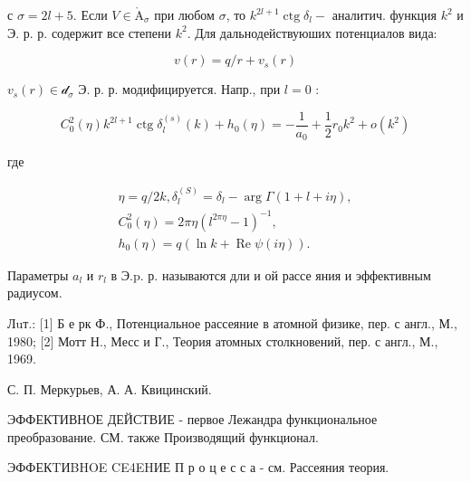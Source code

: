 \documentclass[10pt]{article}
\def\AA{\mathring{\mathrm{A}}}
\begin{document}
с $\sigma=2 l+5$. Если $V \in \AA_{\sigma}$ при любом $\sigma$, то $k^{2 l+1} \operatorname{ctg} \delta_{l}-$ аналитич. функция $k^{2}$ и Э. р. р. содержит все степени $k^{2}$. Для дальнодействуюших потенциалов вида:



\[

v(r)=q / r+v_{s}(r)

\]



$v_{s}(r) \in \mathscr{d}_{\sigma}$ Э. р. р. модифицируется. Напр., при $l=0$ :



\[

C_{0}^{2}(\eta) k^{2 l+1} \operatorname{ctg} \delta_{l}^{(s)}(k)+h_{0}(\eta)=-\frac{1}{a_{0}}+\frac{1}{2} r_{0} k^{2}+o\left(k^{2}\right)

\]



где



\[

\begin{gathered}

\eta=q / 2 k, \delta_{l}^{(S)}=\delta_{l}-\arg \Gamma(1+l+i \eta), \\

C_{0}^{2}(\eta)=2 \pi \eta\left(l^{2 \pi \eta}-1\right)^{-1}, \\

h_{0}(\eta)=q(\ln k+\operatorname{Re} \psi(i \eta)) .

\end{gathered}

\]



Параметры $a_{l}$ и $r_{l}$ в Э.p. р. называются дли и ой рассе яния и эффективным радиусом.



Лuт.: [1] Б е рк Ф., Потенциальное рассеяние в атомной физике, пер. с англ., М., 1980; [2] Мотт Н., Месс и Г., Теория атомных столкновений, пер. с англ., М., 1969.



С. П. Меркурьев, А. А. Квицинский.



ЭФФЕКТИВНОЕ ДЕЙСТВИЕ - первое Лежандра функциональное преобразование. СМ. также Производящий функционал.



ЭФФЕКTИBHOE CE4EHИЕ П р о ц е с с а - см. Рассеяния теория.
\end{document}
